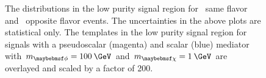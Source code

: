 \begin{figure}[h!]
  \caption{The \ptmiss distributions in the low purity signal region for~\protect{} same flavor and~\protect{} opposite flavor events. The uncertainties in the above plots are statistical only. The \ptmiss templates in the low purity signal region for signals with a pseudoscalar (magenta) and scalar (blue) mediator with $\mMed=100\:\GeV$ and $\mDM=1\:\GeV$ are overlayed and scaled by a factor of 200.}
  \label{fig:metlo}
\end{figure}

